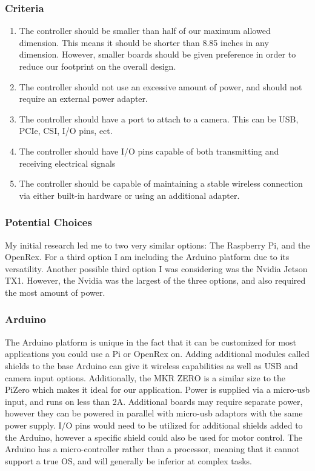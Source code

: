 \documentclass[onecolumn, draftclsnofoot,10pt, compsoc]{IEEEtran}
\begin{document}
\subsubsection{Criteria}
\begin{enumerate}
\item{The controller should  be smaller than half of our maximum 
allowed dimension. This means it should be shorter than 8.85 inches 
in any dimension. However, smaller boards should be given 
preference in order to reduce our footprint on the overall design.}

\item{The controller should not use an excessive amount of power, 
and should not require an external power adapter. }

\item{The controller should have a port to attach to a camera. This 
can be USB, PCIe, CSI, I/O pins, ect.}

\item{The controller should have I/O pins capable of both 
transmitting and receiving electrical signals}

\item{The controller should be capable of maintaining a stable 
wireless connection via either built-in hardware or using an 
additional adapter.}
\end{enumerate}

\subsubsection{Potential Choices}

My initial research led me to two very similar options: The 
Raspberry Pi\cite{r3}, and the OpenRex. For a third option I am including 
the Arduino platform due to its versatility. Another possible third 
option I was considering was the Nvidia Jetson TX1. However, the 
Nvidia was the largest of the three options, and also required the 
most amount of power. 

\subsubsection{Arduino}


The Arduino platform is unique in the fact that it can be 
customized for most applications you could use a Pi or OpenRex on. 
Adding additional modules called shields to the base Arduino can 
give it wireless capabilities as well as USB and camera input 
options. Additionally, the MKR ZERO\cite{r24} is a similar size to the PiZero 
which makes it ideal for our application. Power is supplied via a 
micro-usb input, and runs on less than 2A. Additional boards may 
require separate power, however they can be powered in parallel 
with micro-usb adaptors with the same power supply. I/O pins would 
need to be utilized for additional shields added to the Arduino, 
however a specific shield could also be used for motor control. The 
Arduino has a micro-controller rather than a processor, meaning 
that it cannot support a true OS, and will generally be inferior at 
complex tasks. 
\end{document}
